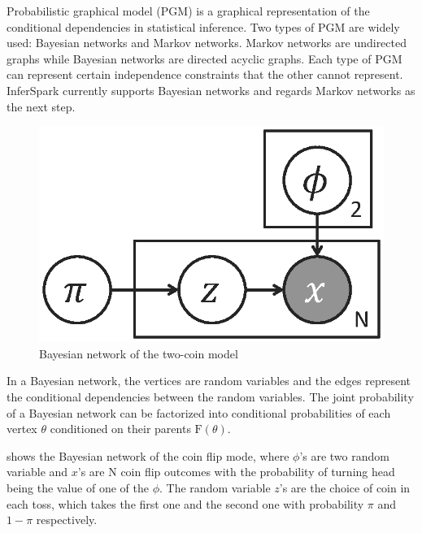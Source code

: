 Probabilistic graphical model \cite{pgm} (PGM) is a graphical representation of the
conditional dependencies in statistical inference. Two types of PGM are widely
used: Bayesian networks and Markov networks. Markov networks are undirected
graphs while Bayesian networks are directed acyclic graphs. Each type of PGM
can represent certain independence constraints that the other cannot represent. 
InferSpark currently supports Bayesian networks and regards Markov networks 
as the next step.  

\begin{figure}
	\centering
	\includegraphics[scale=0.4]{figs/two_coins_latent.eps}
	\caption{Bayesian network of the two-coin model}
	\label{fig:two_coins}
\end{figure}

In a Bayesian network, the vertices are random variables and the edges
represent the conditional dependencies between the random variables.  The
joint probability of a Bayesian network can be factorized into conditional
probabilities of each vertex $\theta$ conditioned on their parents
$\mathrm{F}(\theta)$.  

 shows the Bayesian network of the coin flip mode, where
$\phi$'s are two random variable and $x$'s are N coin flip outcomes with the
probability of turning head being the value of one of the $\phi$. The random
variable $z$'s are the choice of coin in each toss, which takes the first one
and the second one with probability $\pi$ and $1-\pi$ respectively.

